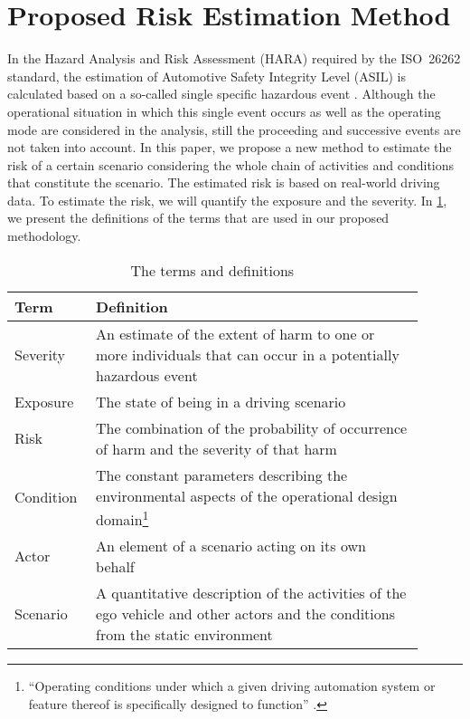 \section{Proposed Risk Estimation Method}
\label{sec:method}
 
In the Hazard Analysis and Risk Assessment (HARA) required by the ISO~26262 standard, the estimation of Automotive Safety Integrity Level (ASIL) is calculated based on a so-called single specific hazardous event \cite{ISO26262}.
Although the operational situation in which this single event occurs as well as the operating mode are considered in the analysis, still the proceeding and successive events are not taken into account.
In this paper, we propose a new method to estimate the risk of a certain scenario considering the whole chain of activities and conditions that constitute the scenario.
The estimated risk is based on real-world driving data. To estimate the risk, we will quantify the exposure and the severity. In \cref{Tab:Terms}, we present the definitions of the terms that are used in our proposed methodology. 

\begin{table}
	\centering
	\caption{The terms and definitions}
	\label{Tab:Terms}
	\begin{tabular}{p{0.15\linewidth} p{0.75\linewidth}} \hline
		\textbf{Term} & \textbf{Definition} \\ \hline
		Severity & An estimate of the extent of harm to one or more individuals that can occur in a potentially hazardous event~\cite{ISO26262} \\
		Exposure & The state of being in a driving scenario \\
		Risk & The combination of the probability of occurrence of harm and the severity of that harm~\cite{ISO26262} \\ 
		Condition & The constant parameters describing the environmental aspects of the operational design domain\footnote{``Operating conditions under which a given driving automation system or feature thereof is specifically designed to function'' \cite{sea2018j3016}.} \\
		Actor & An element of a scenario acting on its own behalf~\cite{ulbrich2015} \\ 
		Scenario & A quantitative description of the activities of the ego vehicle and other actors and the conditions from the static environment \\ \hline
	\end{tabular}
\end{table}

